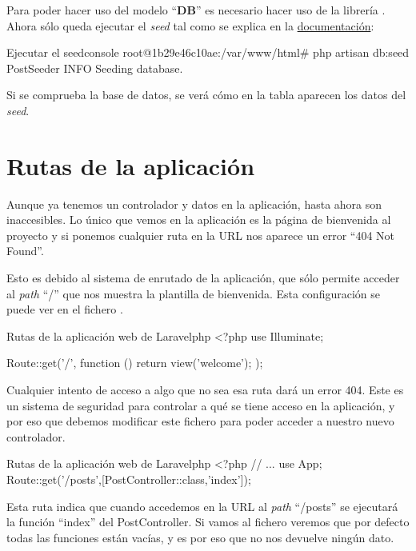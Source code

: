Para poder hacer uso del modelo “\textbf{DB}” es necesario hacer uso de la librería . Ahora sólo queda ejecutar el \textit{seed} tal como se explica en la \href{https://laravel.com/docs/10.x/seeding}{documentación}:

\begin{mycode}{Ejecutar el seed}{console}{}
root@1b29e46c10ae:/var/www/html# php artisan db:seed PostSeeder
INFO  Seeding database.
\end{mycode}

Si se comprueba la base de datos, se verá cómo en la tabla aparecen los datos del \textit{seed}.


\chapter{Rutas de la aplicación}

Aunque ya tenemos un controlador y datos en la aplicación, hasta ahora son inaccesibles. Lo único que vemos en la aplicación es la página de bienvenida al proyecto y si ponemos cualquier ruta en la URL nos aparece un error “404 Not Found”.

Esto es debido al sistema de enrutado de la aplicación, que sólo permite acceder al \textit{path} “/” que nos muestra la plantilla de bienvenida. Esta configuración se puede ver en el fichero .

\begin{mycode}{Rutas de la aplicación web de Laravel}{php}{}
<?php
use Illuminate\Support\Facades\Route;

Route::get('/', function () {
    return view('welcome');
});
\end{mycode}

Cualquier intento de acceso a algo que no sea esa ruta dará un error 404. Este es un sistema de seguridad para controlar a qué se tiene acceso en la aplicación, y por eso que debemos modificar este fichero para poder acceder a nuestro nuevo controlador.

\begin{mycode}{Rutas de la aplicación web de Laravel}{php}{}
<?php
// ...
use App\Http\Controllers\PostController;
Route::get('/posts',[PostController::class,'index']);
\end{mycode}

Esta ruta indica que cuando accedemos en la URL al \textit{path} “/posts” se ejecutará la función “index” del PostController. Si vamos al fichero  veremos que por defecto todas las funciones están vacías, y es por eso que no nos devuelve ningún dato.


